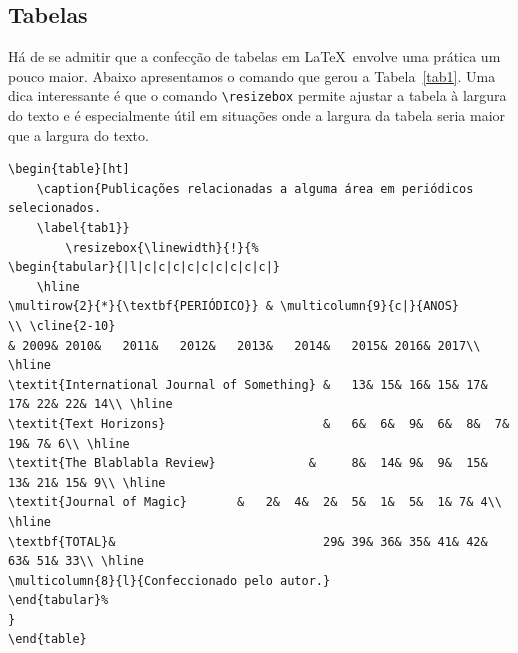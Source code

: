 \subsection{Tabelas}

Há de se admitir que a confecção de tabelas em \LaTeX\ envolve uma prática um pouco maior. Abaixo apresentamos o comando que gerou a Tabela~\ref{tab1}. Uma dica interessante é que o comando \verb+\resizebox+ permite ajustar a tabela à largura do texto e é especialmente útil em situações onde a largura da tabela seria maior que a largura do texto.
\begin{scriptsize}
\begin{verbatim}
\begin{table}[ht] 
    \caption{Publicações relacionadas a alguma área em periódicos selecionados.
    \label{tab1}}
		\resizebox{\linewidth}{!}{%
\begin{tabular}{|l|c|c|c|c|c|c|c|c|c|}
    \hline
\multirow{2}{*}{\textbf{PERIÓDICO}} & \multicolumn{9}{c|}{ANOS}
\\ \cline{2-10}
& 2009&	2010&	2011&	2012&	2013&	2014&	2015& 2016& 2017\\ \hline
\textit{International Journal of Something} &	13&	15&	16&	15&	17&	17&	22& 22& 14\\ \hline 
\textit{Text Horizons}               		& 	6&	6&	9&	6&	8&	7&	19& 7& 6\\ \hline 
\textit{The Blablabla Review}             & 	8&	14&	9&	9&	15&	13&	21& 15& 9\\ \hline 
\textit{Journal of Magic}		&	2&	4&	2&	5&	1&	5&	1& 7& 4\\ \hline 
\textbf{TOTAL}&                           	29&	39&	36&	35&	41&	42&	63& 51& 33\\ \hline 
\multicolumn{8}{l}{Confeccionado pelo autor.}
\end{tabular}%
}
\end{table}
\end{verbatim}
\end{scriptsize}

